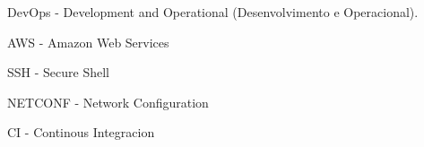 \listoffigures*


\begin{siglas}
  \item DevOps - Development and Operational (Desenvolvimento e Operacional).
  \item AWS - Amazon Web Services
  \item SSH - Secure Shell
  \item NETCONF - Network Configuration
  \item CI - Continous Integracion
\end{siglas}


\tableofcontents*
\cleardoublepage

